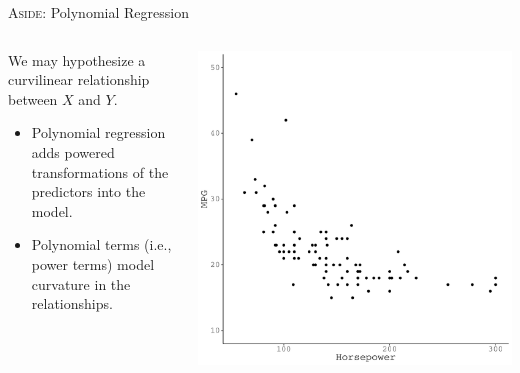 \documentclass{beamer}\usepackage[]{graphicx}\usepackage[]{color}
\makeatletter
\def\maxwidth{ %
  \ifdim\Gin@nat@width>\linewidth
    \linewidth
  \else
    \Gin@nat@width
  \fi
}
\newenvironment{knitrout}{}{} %
\makeatother
\begin{document}
\watermarkoff %

\begin{frame}{\textsc{Aside}: Polynomial Regression}
  
  \begin{columns}
    \begin{column}{0.5\textwidth}
      
      We may hypothesize a curvilinear relationship between $X$ and $Y$.
      \vc
      \begin{itemize}
      \item Polynomial regression adds powered transformations of the
        predictors into the model.
        \vc
      \item Polynomial terms (i.e., power terms) model curvature in the
        relationships.
      \end{itemize}
      
    \end{column}
    \begin{column}{0.5\textwidth}
      
\begin{knitrout}\footnotesize
{}\color{fgcolor}

{\centering \includegraphics[width=\maxwidth]{figure/unnamed-chunk-7-1} 

}



\end{knitrout}

\end{column}
\end{columns}

\end{frame}
\end{document}
